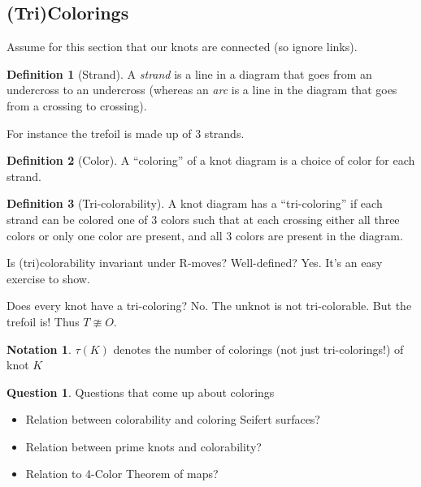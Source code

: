 \documentclass[11pt]{article}
\theoremstyle{plain}
\theoremstyle{definition}
\newtheorem{definition}{Definition}
\newtheorem{notation}{Notation}
\newtheorem{question}{Question}
\begin{document}
\subsection{(Tri)Colorings}

Assume for this section that our knots are connected (so ignore links).


\begin{definition}[Strand]
  A \textit{strand} is a line in a diagram that goes from an undercross to an undercross (whereas an \textit{arc} is a line in the diagram that goes from a crossing to crossing).

  For instance the trefoil is made up of 3 strands.
\end{definition}

\begin{definition}[Color]
A ``coloring'' of a knot diagram is a choice of color for each strand.
\end{definition}

\begin{definition}[Tri-colorability]
A knot diagram has a ``tri-coloring'' if each strand can be colored one of 3 colors such that at each crossing either all three colors or only one color are present, and all 3 colors are present in the diagram.
\end{definition}

Is (tri)colorability invariant under R-moves? Well-defined? Yes. It's an easy exercise to show.

Does every knot have a tri-coloring? No. The unknot is not tri-colorable. But the trefoil is! Thus $T\ncong O$.

\begin{notation}
  $\tau(K)$ denotes the number of colorings (not just tri-colorings!) of knot $K$
\end{notation}

\begin{question}
  Questions that come up about colorings
  \begin{itemize}
  \item Relation between colorability and coloring Seifert surfaces?
  \item Relation between prime knots and colorability?
  \item Relation to 4-Color Theorem of maps?
  \end{itemize}
\end{question}
\end{document}
